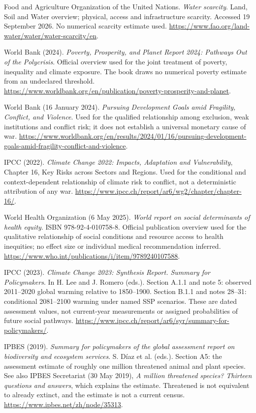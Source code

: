  Food and Agriculture Organization of the United Nations.
\textit{Water scarcity}. Land, Soil and Water overview; physical, access and
infrastructure scarcity. Accessed 19 September 2026. No numerical scarcity
estimate used.
\url{https://www.fao.org/land-water/water/water-scarcity/en}.

 World Bank (2024).
\textit{Poverty, Prosperity, and Planet Report 2024: Pathways Out of the
Polycrisis}. Official overview used for the joint treatment of poverty,
inequality and climate exposure. The book draws no numerical poverty
estimate from an undeclared threshold.
\url{https://www.worldbank.org/en/publication/poverty-prosperity-and-planet}.

 World Bank (16 January 2024).
\textit{Pursuing Development Goals amid Fragility, Conflict, and Violence}.
Used for the qualified relationship among exclusion, weak institutions and
conflict risk; it does not establish a universal monetary cause of war.
\url{https://www.worldbank.org/en/results/2024/01/16/pursuing-development-goals-amid-fragility-conflict-and-violence}.

 IPCC (2022). \textit{Climate Change 2022: Impacts,
Adaptation and Vulnerability}, Chapter 16, Key Risks across Sectors and
Regions. Used for the conditional and context-dependent relationship of
climate risk to conflict, not a deterministic attribution of any war.
\url{https://www.ipcc.ch/report/ar6/wg2/chapter/chapter-16/}.

 World Health Organization (6 May 2025).
\textit{World report on social determinants of health equity}.
ISBN 978-92-4-010758-8. Official publication overview used for the qualitative
relationship of social conditions and resource access to health inequities;
no effect size or individual medical recommendation inferred.
\url{https://www.who.int/publications/i/item/9789240107588}.

 IPCC (2023). \textit{Climate Change 2023: Synthesis Report.
Summary for Policymakers}. In H. Lee and J. Romero (eds.). Section A.1.1 and
note 5: observed 2011--2020 global warming relative to 1850--1900. Section
B.1.1 and notes 28--31: conditional 2081--2100 warming under named SSP
scenarios. These are dated assessment values, not current-year measurements
or assigned probabilities of future social pathways.
\url{https://www.ipcc.ch/report/ar6/syr/summary-for-policymakers/}.

 IPBES (2019). \textit{Summary for policymakers of the
global assessment report on biodiversity and ecosystem services}.
S. D\'iaz et al. (eds.). Section A5: the assessment estimate of roughly one
million threatened animal and plant species. See also IPBES Secretariat
(30 May 2019), \textit{A million threatened species? Thirteen questions and
answers}, which explains the estimate. Threatened is not equivalent to
already extinct, and the estimate is not a current census.
\url{https://www.ipbes.net/zh/node/35313}.

